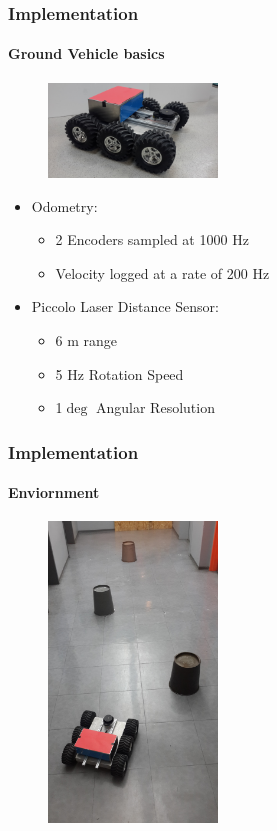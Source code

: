 \documentclass{beamer}
\begin{document}
	\begin{frame}
		\frametitle{Implementation}
		
		\framesubtitle{Ground Vehicle basics}
		
		\begin{figure}
			\includegraphics[width=0.4\textwidth,height=0.4\textheight]{GMM}
		\end{figure}

		\begin{itemize}
			\item Odometry:
				\begin{itemize}
					\item 2 Encoders sampled at 1000 Hz
					\item Velocity logged at a rate of 200 Hz
				\end{itemize}
			\item Piccolo Laser Distance Sensor:
				\begin{itemize}
					\item 6 m range
					\item 5 Hz Rotation Speed
					\item 1$\deg$ Angular Resolution
				\end{itemize}
		\end{itemize}
	\end{frame}
	
	\begin{frame}
		\frametitle{Implementation}
		
		\framesubtitle{Enviornment}
		
		\begin{figure}
			\includegraphics[width=0.4\textwidth,height=0.7\textheight]{Full}
		\end{figure}
		
	\end{frame}
\end{document}

